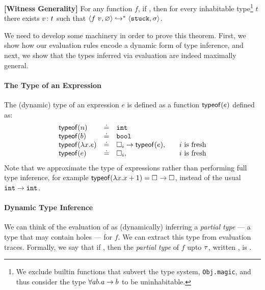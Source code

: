 \begin{thm}{\textbf{[Witness Generality]}}
\label{thm:soundness}
  For any function $f$, if ,
  then for every inhabitable type\footnote{We exclude builtin functions that subvert the type system, \eg \texttt{Obj.magic}, and thus consider the type $\forall a b. {a} \rightarrow b$ to be uninhabitable.}  $t$ there exists ${v} \colon {t}$ such that
  $\langle f \ v, \varnothing \rangle \hookrightarrow^{*} \langle \mathtt{stuck}, \sigma \rangle$.
\end{thm}

We need to develop some machinery in order to prove this theorem.
First, we show how our evaluation rules encode a dynamic form of
type inference, and next, we show that the types inferred via
evaluation are indeed maximally general.

\paragraph{The Type of an Expression} The (dynamic) type of an
expression $e$ is defined as a function $\mathsf{typeof}(e)$ defined as:
  \[
  \begin{array}{lcll}
    \mathsf{typeof}(n)   & \doteq & \mathtt{int} & \\
    \mathsf{typeof}(b)   & \doteq & \mathtt{bool} & \\
    \mathsf{typeof}(\lambda x. e) & \doteq & {\square_{i}} \rightarrow \mathsf{typeof}(e), & \quad \text{$i$ is fresh} \\
    \mathsf{typeof}(e) & \doteq & \square_{i}, & \quad \text{$i$ is fresh} \\
  \end{array}
  \]
%
Note that we approximate the type of expressions rather than
performing full type inference, for example
$\mathsf{typeof}(\lambda x. x + 1) = {\square_{}} \rightarrow \square_{}$,
instead of the usual ${\mathtt{int}} \rightarrow \mathtt{int}$.

\paragraph{Dynamic Type Inference}
We can think of the evaluation of  as (dynamically)
inferring a \emph{partial type} --- a type that may contain holes ---
for $f$.
%
We can extract this type from evaluation traces.
%
Formally, we say that if ,
then the \emph{partial type} of $f$ upto $\tau$, written ,
is .
%

